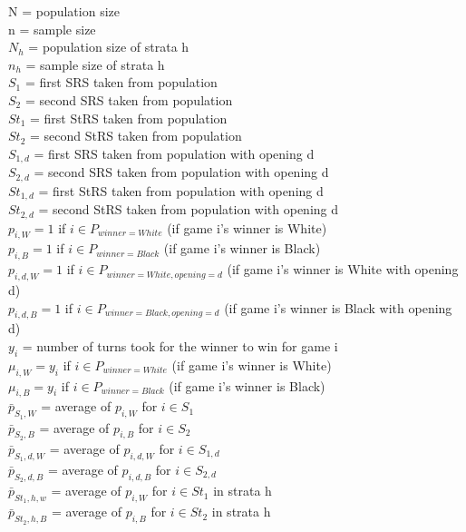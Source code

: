 \documentclass[11pt,]{article}
\begin{document}
N = population size\\
n = sample size\\
\(N_h\) = population size of strata h\\
\(n_h\) = sample size of strata h\\
\(S_1\) = first SRS taken from population\\
\(S_2\) = second SRS taken from population\\
\(St_1\) = first StRS taken from population\\
\(St_2\) = second StRS taken from population\\
\(S_{1,d}\) = first SRS taken from population with opening d\\
\(S_{2,d}\) = second SRS taken from population with opening d\\
\(St_{1,d}\) = first StRS taken from population with opening d\\
\(St_{2,d}\) = second StRS taken from population with opening d\\
\(p_{i,W} = 1\) if \(i \in P_{winner = White}\) (if game i's winner is
White)\\
\(p_{i,B} = 1\) if \(i \in P_{winner = Black}\) (if game i's winner is
Black)\\
\(p_{i,d,W} = 1\) if \(i \in P_{winner = White, opening = d}\) (if game
i's winner is White with opening d)\\
\(p_{i,d,B} = 1\) if \(i \in P_{winner = Black, opening = d}\) (if game
i's winner is Black with opening d)\\
\(y_i\) = number of turns took for the winner to win for game i\\
\(\mu_{i,W} = y_i\) if \(i \in P_{winner = White}\) (if game i's winner
is White)\\
\(\mu_{i,B} = y_i\) if \(i \in P_{winner = Black}\) (if game i's winner
is Black)\\
\(\bar p_{S_1,W}\) = average of \(p_{i,W}\) for \(i \in S_1\)\\
\(\bar p_{S_2,B}\) = average of \(p_{i,B}\) for \(i \in S_2\)\\
\(\bar p_{S_1,d,W}\) = average of \(p_{i,d,W}\) for \(i \in S_{1,d}\)\\
\(\bar p_{S_2,d,B}\) = average of \(p_{i,d,B}\) for \(i \in S_{2,d}\)\\
\(\bar p_{St_1,h,w}\) = average of \(p_{i,W}\) for \(i \in St_1\) in
strata h\\
\(\bar p_{St_2,h,B}\) = average of \(p_{i,B}\) for \(i \in St_2\) in
strata h\\
\end{document}
